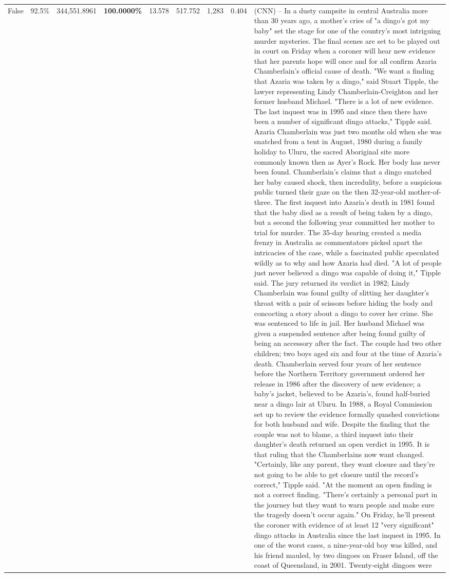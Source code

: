 \begin{table}[H]
\begin{tabular}{lllrlllll}
False & 92.5\% & 344,551.8961 & \bfseries \color{red} 100.0000\% & 13.578 & 517.752 & 1,283 & 0.404 & (CNN) -- In a dusty campsite in central Australia more than 30 years ago, a mother's cries of "a dingo's got my baby" set the stage for one of the country's most intriguing murder mysteries. The final scenes are set to be played out in court on Friday when a coroner will hear new evidence that her parents hope will once and for all confirm Azaria Chamberlain's official cause of death. "We want a finding that Azaria was taken by a dingo," said Stuart Tipple, the lawyer representing Lindy Chamberlain-Creighton and her former husband Michael. "There is a lot of new evidence. The last inquest was in 1995 and since then there have been a number of significant dingo attacks," Tipple said. Azaria Chamberlain was just two months old when she was snatched from a tent in August, 1980 during a family holiday to Uluru, the sacred Aboriginal site more commonly known then as Ayer's Rock. Her body has never been found. Chamberlain's claims that a dingo snatched her baby caused shock, then incredulity, before a suspicious public turned their gaze on the then 32-year-old mother-of-three. The first inquest into Azaria's death in 1981 found that the baby died as a result of being taken by a dingo, but a second the following year committed her mother to trial for murder. The 35-day hearing created a media frenzy in Australia as commentators picked apart the intricacies of the case, while a fascinated public speculated wildly as to why and how Azaria had died. "A lot of people just never believed a dingo was capable of doing it," Tipple said. The jury returned its verdict in 1982; Lindy Chamberlain was found guilty of slitting her daughter's throat with a pair of scissors before hiding the body and concocting a story about a dingo to cover her crime. She was sentenced to life in jail. Her husband Michael was given a suspended sentence after being found guilty of being an accessory after the fact. The couple had two other children; two boys aged six and four at the time of Azaria's death. Chamberlain served four years of her sentence before the Northern Territory government ordered her release in 1986 after the discovery of new evidence; a baby's jacket, believed to be Azaria's, found half-buried near a dingo lair at Uluru. In 1988, a Royal Commission set up to review the evidence formally quashed convictions for both husband and wife. Despite the finding that the couple was not to blame, a third inquest into their daughter's death returned an open verdict in 1995. It is that ruling that the Chamberlains now want changed. "Certainly, like any parent, they want closure and they're not going to be able to get closure until the record's correct," Tipple said. "At the moment an open finding is not a correct finding. "There's certainly a personal part in the journey but they want to warn people and make sure the tragedy doesn't occur again." On Friday, he'll present the coroner with evidence of at least 12 "very significant" dingo attacks in Australia since the last inquest in 1995. In one of the worst cases, a nine-year-old boy was killed, and his friend mauled, by two dingoes on Fraser Island, off the coast of Queensland, in 2001. Twenty-eight dingoes were 
\end{tabular}
\end{table}
